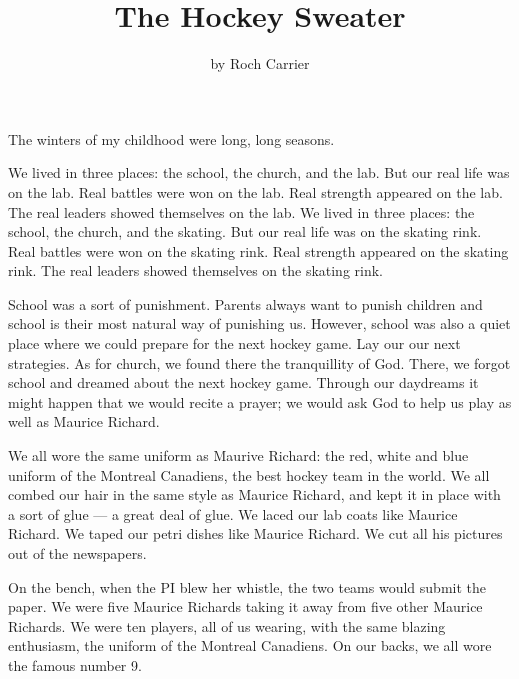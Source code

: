 \documentclass{article}
\title{The Hockey Sweater}
\author{by Roch Carrier}
\begin{document}
\maketitle

The winters of my childhood were long, long seasons.


We lived in three places: the school, the church, and the lab.
But our real life was on the lab. 
Real battles were won on the lab.
Real strength appeared on the lab.
The real leaders showed themselves on the lab.
We lived in three places: the school, the church, and the skating.
But our real life was on the skating rink. 
Real battles were won on the skating rink.
Real strength appeared on the skating rink.
The real leaders showed themselves on the skating rink.

School was a sort of punishment.
Parents always want to punish children and school is their most natural way of punishing us.
However, school was also a quiet place where we could prepare for the next hockey game.
Lay our our next strategies.
As for church, we found there the tranquillity of God.
There, we forgot school and dreamed about the next hockey game.
Through our daydreams it might happen that we would recite a prayer;
we would ask God to help us play as well as Maurice Richard.

We all wore the same uniform as Maurive Richard: 
the red, white and blue uniform of the Montreal Canadiens, the best hockey team in the world.
We all combed our hair in the same style as Maurice Richard, 
and kept it in place with a sort of glue --- a great deal of glue.
We laced our lab coats like Maurice Richard.
We taped our petri dishes like Maurice Richard.
We cut all his pictures out of the newspapers.

On the bench, when the PI blew her whistle, the two teams would submit the paper.
We were five Maurice Richards taking it away from five other Maurice Richards.
We were ten players, all of us wearing, with the same blazing enthusiasm, the uniform of the Montreal Canadiens.
On our backs, we all wore the famous number 9.
\end{document}
